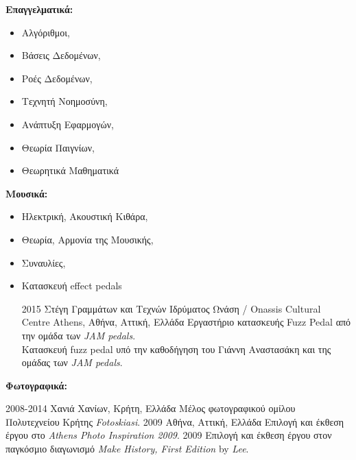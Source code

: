 \documentclass[print]{keros-cv} %
\begin{document}
\textbf{Επαγγελματικά:} 
\begin{itemize}
\item[] Αλγόριθμοι,
\item[] Βάσεις Δεδομένων,
\item[] Ροές Δεδομένων,
\item[] Τεχνητή Νοημοσύνη,
\item[] Ανάπτυξη Εφαρμογών,
\item[] Θεωρία Παιγνίων,
\item[] Θεωρητικά Μαθηματικά
\end{itemize}

\newpage

\textbf{Μουσικά:}
\begin{itemize}
\item[] Ηλεκτρική, Ακουστική Κιθάρα,
\item[] Θεωρία, Αρμονία της Μουσικής,
\item[] Συναυλίες,
\item[] Κατασκευή effect pedals\\
\begin{entrylist}
\entry
{2015}
{}
{Στέγη Γραμμάτων και Τεχνών Ιδρύματος Ωνάση / Onassis Cultural Centre Athens, Αθήνα, Αττική, Ελλάδα}
{Εργαστήριο κατασκευής Fuzz Pedal από την ομάδα των \textit{JAM pedals}.\\
Κατασκευή fuzz pedal υπό την καθοδήγηση του Γιάννη Αναστασάκη και της ομάδας των \textit{JAM pedals}.}
\end{entrylist}
\end{itemize}
\textbf{Φωτογραφικά:}\\
\begin{entrylist}
\entry
{2008-2014}
{}
{Χανιά Χανίων, Κρήτη, Ελλάδα}
{Μέλος φωτογραφικού ομίλου Πολυτεχνείου Κρήτης \textit{Fotoskiasi}.}
\entry
{2009}
{}
{Αθήνα, Αττική, Ελλάδα}
{Επιλογή και έκθεση έργου στο \textit{Athens Photo Inspiration 2009}.}
\entry
{2009}
{}
{}
{Επιλογή και έκθεση έργου στον παγκόσμιο διαγωνισμό \textit{Make History, First Edition} by \emph{Lee}.}
\end{entrylist}
\end{document}
